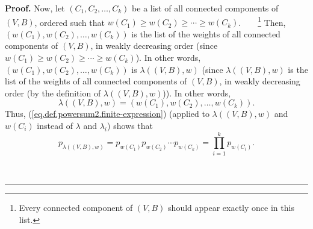 \documentclass[numbers=enddot,12pt,final,onecolumn,notitlepage]{scrartcl}%
\theoremstyle{definition}
\newenvironment{proof}[1][Proof]{\noindent\textbf{#1.} }{\ \rule{0.5em}{0.5em}}
\newenvironment{verlong}{}{}
\let\prodnonlimits\prod
\renewcommand{\prod}{\prodnonlimits\limits}
\begin{document}
\begin{verlong}
\begin{proof}
Now, let $\left(  C_{1},C_{2},\ldots,C_{k}\right)  $ be a list of all
connected components of $\left(  V,B\right)  $, ordered such that $w\left(
C_{1}\right)  \geq w\left(  C_{2}\right)  \geq\cdots\geq w\left(
C_{k}\right)  $.\ \ \ \ \footnote{Every connected component of $\left(
V,B\right)  $ should appear exactly once in this list.} Then, $\left(
w\left(  C_{1}\right)  ,w\left(  C_{2}\right)  ,\ldots,w\left(  C_{k}\right)
\right)  $ is the list of the weights of all connected components of $\left(
V,B\right)  $, in weakly decreasing order (since $w\left(  C_{1}\right)  \geq
w\left(  C_{2}\right)  \geq\cdots\geq w\left(  C_{k}\right)  $). In other
words, $\left(  w\left(  C_{1}\right)  ,w\left(  C_{2}\right)  ,\ldots
,w\left(  C_{k}\right)  \right)  $ is $\lambda\left(  \left(  V,B\right)
,w\right)  $ (since $\lambda\left(  \left(  V,B\right)  ,w\right)  $ is the
list of the weights of all connected components of $\left(  V,B\right)  $, in
weakly decreasing order (by the definition of $\lambda\left(  \left(
V,B\right)  ,w\right)  $)). In other words,
\[
\lambda\left(  \left(  V,B\right)  ,w\right)  =\left(  w\left(  C_{1}\right)
,w\left(  C_{2}\right)  ,\ldots,w\left(  C_{k}\right)  \right)  .
\]
Thus, (\ref{eq.def.powersum2.finite-expression}) (applied to $\lambda\left(
\left(  V,B\right)  ,w\right)  $ and $w\left(  C_{i}\right)  $ instead of
$\lambda$ and $\lambda_{i}$) shows that{}%
\begin{equation}
p_{\lambda\left(  \left(  V,B\right)  ,w\right)  }=p_{w\left(  C_{1}\right)
}p_{w\left(  C_{2}\right)  }\cdots p_{w\left(  C_{k}\right)  }=\prod_{i=1}%
^{k}p_{w\left(  C_{i}\right)  }. \label{pf.lem.wEqs.sum.p1}%
\end{equation}



\end{proof}
\end{verlong}
\end{document}
